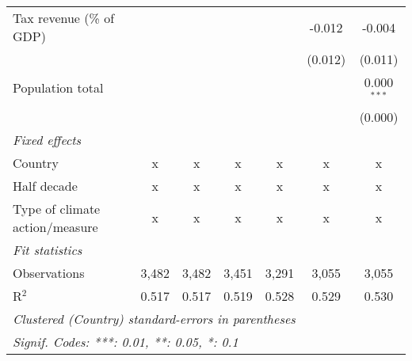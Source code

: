 \begin{tabular}{lcccccc}
   Tax revenue (\% of GDP)              &              &               &                &               & -0.012        & -0.004\\   
                                        &              &               &                &               & (0.012)       & (0.011)\\   
   Population total                     &              &               &                &               &               & 0.000$^{***}$\\   
                                        &              &               &                &               &               & (0.000)\\   
   \emph{Fixed effects}\\
   Country                              & x            & x             & x              & x             & x             & x\\  
   Half decade                          & x            & x             & x              & x             & x             & x\\  
   Type of climate action/measure       & x            & x             & x              & x             & x             & x\\  
   \midrule \emph{Fit statistics}\\
   Observations                         & 3,482        & 3,482         & 3,451          & 3,291         & 3,055         & 3,055\\  
   R$^2$                                & 0.517        & 0.517         & 0.519          & 0.528         & 0.529         & 0.530\\  
   \midrule
   \multicolumn{7}{l}{\emph{Clustered (Country) standard-errors in parentheses}}\\
   \multicolumn{7}{l}{\emph{Signif. Codes: ***: 0.01, **: 0.05, *: 0.1}}\\
\end{tabular}
\par\endgroup


